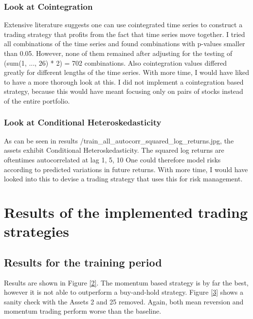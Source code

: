 \subsection{Look at Cointegration}
Extensive literature suggests one can use cointegrated time series to construct a trading strategy that profits from the fact that time series move together. I tried all combinations of the time series and found combinations with p-values smaller than 0.05. However, none of them remained after adjusting for the testing of (sum(1, ..., 26) * 2) = 702 combinations. Also cointegration values differed greatly for different lengths of the time series. With more time, I would have liked to have a more thorough look at this. I did not implement a cointegration based strategy, because this would have meant focusing only on pairs of stocks instead of the entire portfolio. 

\subsection{Look at Conditional Heteroskedasticity}
As can be seen in results \slash train\_all\_autocorr\_squared\_log\_returns.jpg, the assets exhibit Conditional Heteroskedasticity. The squared log returns are oftentimes autocorrelated at lag 1, 5, 10 One could therefore model risks according to predicted variations in future returns. With more time, I would have looked into this to devise a trading strategy that uses this for risk management. 



\chapter{Results of the implemented trading strategies}

\section{Results for the training period}
Results are shown in Figure \ref{2}. The momentum based strategy is by far the best, however it is not able to outperform a buy-and-hold strategy. Figure \ref{3} shows a sanity check with the Assets 2 and 25 removed. Again, both mean reversion and momentum trading perform worse than the baseline. 


